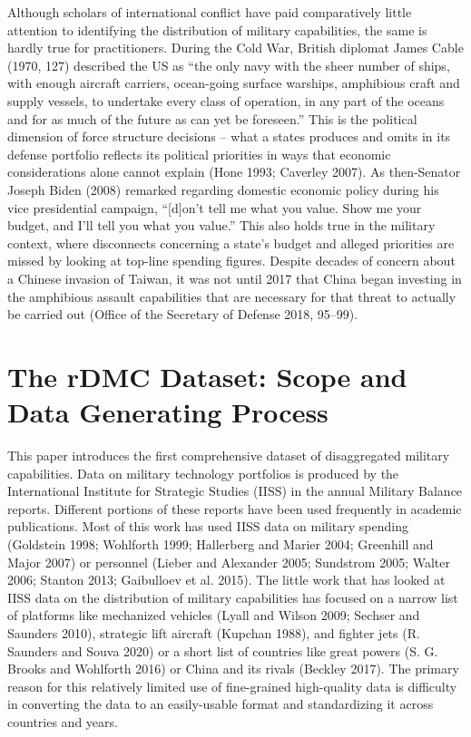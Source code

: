 \documentclass[
]{article}
\begin{document}
Although scholars of international conflict have paid comparatively little attention to identifying the distribution of military capabilities, the same is hardly true for practitioners. During the Cold War, British diplomat James Cable (1970, 127) described the US as ``the only navy with the sheer number of ships, with enough aircraft carriers, ocean-going surface warships, amphibious craft and supply vessels, to undertake every class of operation, in any part of the oceans and for as much of the future as can yet be foreseen.'' This is the political dimension of force structure decisions -- what a states produces and omits in its defense portfolio reflects its political priorities in ways that economic considerations alone cannot explain (Hone 1993; Caverley 2007). As then-Senator Joseph Biden (2008) remarked regarding domestic economic policy during his vice presidential campaign, ``{[}d{]}on't tell me what you value. Show me your budget, and I'll tell you what you value.'' This also holds true in the military context, where disconnects concerning a state's budget and alleged priorities are missed by looking at top-line spending figures. Despite decades of concern about a Chinese invasion of Taiwan, it was not until 2017 that China began investing in the amphibious assault capabilities that are necessary for that threat to actually be carried out (Office of the Secretary of Defense 2018, 95--99).

\hypertarget{the-rdmc-dataset-scope-and-data-generating-process}{%
\section{The rDMC Dataset: Scope and Data Generating Process}\label{the-rdmc-dataset-scope-and-data-generating-process}}

This paper introduces the first comprehensive dataset of disaggregated military capabilities. Data on military technology portfolios is produced by the International Institute for Strategic Studies (IISS) in the annual Military Balance reports. Different portions of these reports have been used frequently in academic publications. Most of this work has used IISS data on military spending (Goldstein 1998; Wohlforth 1999; Hallerberg and Marier 2004; Greenhill and Major 2007) or personnel (Lieber and Alexander 2005; Sundstrom 2005; Walter 2006; Stanton 2013; Gaibulloev et al. 2015). The little work that has looked at IISS data on the distribution of military capabilities has focused on a narrow list of platforms like mechanized vehicles (Lyall and Wilson 2009; Sechser and Saunders 2010), strategic lift aircraft (Kupchan 1988), and fighter jets (R. Saunders and Souva 2020) or a short list of countries like great powers (S. G. Brooks and Wohlforth 2016) or China and its rivals (Beckley 2017). The primary reason for this relatively limited use of fine-grained high-quality data is difficulty in converting the data to an easily-usable format and standardizing it across countries and years.
\end{document}
